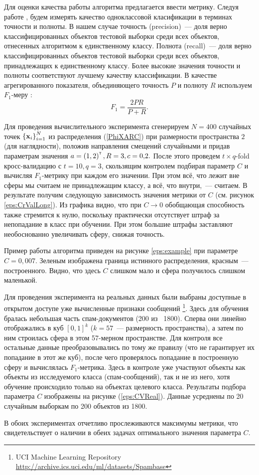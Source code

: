 Для оценки качества работы алгоритма предлагается ввести метрику. 
Следуя работе  \cite{Romanenko2012}, будем измерять качество одноклассовой класификации в терминах точности и полноты. 
В нашем случае точность (precision)~--- доля верно классифицированных объектов тестовой выборки среди всех объектов, отнесенных алгоритмом к единственному классу. 
Полнота (recall)~--- доля верно классифицированных объектов тестовой выборки среди всех объектов, принадлежащих к единственному классу. 
Более высокие значения точности и полноты соответствуют лучшему качеству классификации. 
В качестве агрегированного показателя, объединяющего точность $P$ и полноту $R$ используем $F_1$-меру \cite{Rijsbergen1979}:
$$F_1 = \frac{2PR}{P+R}.$$

Для проведения вычислительного эксперимента сгенерируем $N=400$ случайных точек $\left\{\boldsymbol{\mathbf{x}}_i\right\}_{i=1}^N$ из распределения (\ref{PhiXARC}) при размерности пространства $2$ (для наглядности), положив направления смещений случайными и придав параметрам значения $a = \left(1,2\right)^{\text{\tiny\sffamily\upshape\mdseries T}}, R = 3, c = 0{,}2.$
После этого проведем $t{\times}q$-fold кросс-валидацию с $t = 10, q = 3$, скользящим контролем подбирая параметр $C$ и вычисляя $F_1$-метрику при каждом его значении. При этом всё, что лежит вне сферы мы считаем не принадлежащим классу, а всё, что внутри,~--- считаем.
В результате получим следующую зависимость значения метрики от $C$ (см. рисунок \ref{eps:CrValLong}).
Из графика видно, что при $C\to 0$ обобщающая способность также стремится к нулю, поскольку практически отсутствует штраф за непопадание в класс при обучении. 
При этом большие штрафы заставляют необоснованно увеличивать сферу, снижая точность.

Пример работы алгоритма приведен на рисунке \ref{eps:example} при параметре $C = 0{,}007.$ 
Зеленым изображена граница истинного распределения, красным~--- построенного.
Видно, что здесь $C$ слишком мало и сфера получилось слишком маленькой.



Для проведения эксперимента на реальных данных были выбраны доступные в открытом доступе уже вычисленные признаки сообщений \footnote{UCI Machine Learning Repository \href{http://archive.ics.uci.edu/ml/datasets/Spambase}{http://archive.ics.uci.edu/ml/datasets/Spambase}}. 
Здесь для обучения бралась небольшая часть спам-документов (200 из ~1800). 
Сперва они линейно отображались в куб $[0, 1]^k$ ($k = 57$~--- размерность пространства), а затем по ним строилась сфера в этом 57-мерном пространстве. 
Для контроля все остальные данные преобразовывались по тому же правилу (что не гарантирует их попадание в этот же куб), после чего проверялось попадание в построенную сферу и вычислялась $F_1$-метрика. 
Здесь в контроле уже участвуют объекты как объекты из исследуемого класса (спам-сообщений), так и не из него, хотя обучение происходило только на объектах целевого класса. 
Результаты подбора параметра $C$ изображены на рисунке (\ref{eps:CVReal}). Данные усреднены по 20 случайным выборкам по 200 объектов из 1800.



В обоих экспериментах отчетливо прослеживаются максимумы метрики, что свидетельствует о наличии в обеих задачах оптимального значения параметра $C.$
